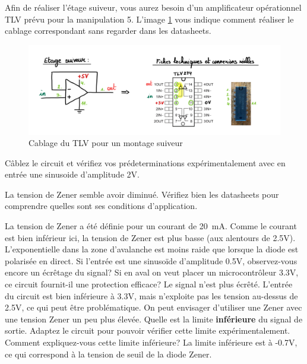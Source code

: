 \documentclass{../template/labo}
\begin{document}
\begin{manip}
Afin de réaliser l'étage suiveur, vous aurez besoin d'un amplificateur opérationnel TLV prévu pour la manipulation 5. L'image \ref{fig:tlv_suiveur} vous indique comment réaliser le cablage correspondant sans regarder dans les datasheets.
\begin{figure}[h!]
	\begin{center}
		\includegraphics{figures/tlv_suiveur.png}
	\end{center}
	\caption{Cablage du TLV pour un montage suiveur}
	\label{fig:tlv_suiveur}
\end{figure}

\Question
{Câblez le circuit et vérifiez vos prédeterminations expérimentalement avec en entrée une sinusoide d'amplitude 2V. 
\begin{astuce}
	La tension de Zener semble avoir diminué.
	Vérifiez bien les datasheets pour comprendre quelles sont ses conditions d'application.
\end{astuce}
}
{La tension de Zener a été définie pour un courant de 20~mA. Comme le courant est bien inférieur ici, la tension de Zener est plus basse (aux alentours de 2.5V). L'exponentielle dans la zone d'avalanche est moins raide que lorsque la diode est polarisée en direct. }
\label{Q:zener_4}
\Question
{Si l'entrée est une sinusoïde d'amplitude 0.5V, observez-vous encore un écrêtage du signal? Si en aval on veut placer un microcontrôleur 3.3V, ce circuit fournit-il une protection efficace? }
{Le signal n'est plus écrêté. L'entrée du circuit est bien inférieure à 3.3V, mais n'exploite pas les tension au-dessus de 2.5V, ce qui peut être problématique. On peut envisager d'utiliser une Zener avec une tension Zener un peu plus élevée.
}
\label{Q:zener_4}
\Question
{Quelle est la limite {\bf inférieure} du signal de sortie. Adaptez le circuit pour pouvoir vérifier cette limite expérimentalement. Comment expliquez-vous cette limite inférieure? }
{La limite inférieure est à -0.7V, ce qui correspond à la tension de seuil de la diode Zener. }
\label{Q:zener_5}

\end{manip}
\end{document}
